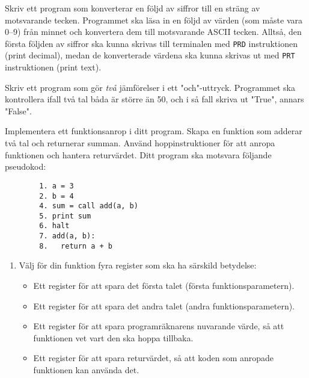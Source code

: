 \begin{Datorarbete}
    \item Skriv ett program som konverterar en följd av siffror till en sträng av motsvarande tecken. Programmet ska läsa in en följd av värden (som måste vara 0--9) från minnet och konvertera dem till motsvarande ASCII tecken. Alltså, den första följden av siffror ska kunna skrivas till terminalen med \texttt{PRD} instruktionen (print decimal), medan de konverterade värdena ska kunna skrivas ut med \texttt{PRT} instruktionen (print text).

    \item Skriv ett program som gör \emph{två} jämförelser i ett "och"-uttryck. Programmet ska kontrollera ifall två tal båda är större än 50, och i så fall skriva ut "True", annars "False".

    \item Implementera ett funktionsanrop i ditt program. Skapa en funktion som adderar två tal och returnerar summan. Använd hoppinstruktioner för att anropa funktionen och hantera returvärdet. Ditt program ska motsvara följande pseudokod:
    \begin{verbatim}
		1. a = 3
		2. b = 4
		4. sum = call add(a, b)
		5. print sum
		6. halt
		7. add(a, b):
		8.   return a + b
	\end{verbatim}
    \begin{enumerate}
        \item Välj för din funktion fyra register som ska ha särskild betydelse:
              \begin{itemize}
                  \item Ett register för att spara det första talet (första funktionsparametern).
                  \item Ett register för att spara det andra talet (andra funktionsparametern).
                  \item Ett register för att spara programräknarens nuvarande värde, så att funktionen vet vart den ska hoppa tillbaka.
                  \item Ett register för att spara returvärdet, så att koden som anropade funktionen kan använda det.
              \end{itemize}


\end{enumerate}
\end{Datorarbete}
